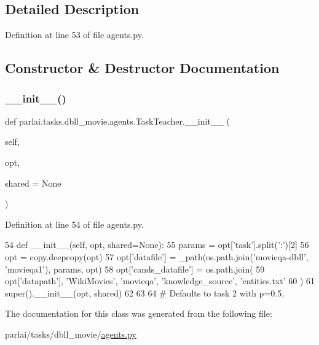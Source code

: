 \subsection{Detailed Description}


Definition at line 53 of file agents.\+py.



\subsection{Constructor \& Destructor Documentation}
\mbox{\label{classparlai_1_1tasks_1_1dbll__movie_1_1agents_1_1TaskTeacher_a2eed62654cfdb4fc25372c15bbb810b3}} 
\subsubsection{\texorpdfstring{\+\_\+\+\_\+init\+\_\+\+\_\+()}{\_\_init\_\_()}}
{\footnotesize\ttfamily def parlai.\+tasks.\+dbll\+\_\+movie.\+agents.\+Task\+Teacher.\+\_\+\+\_\+init\+\_\+\+\_\+ (\begin{DoxyParamCaption}\item[{}]{self,  }\item[{}]{opt,  }\item[{}]{shared = {\ttfamily None} }\end{DoxyParamCaption})}



Definition at line 54 of file agents.\+py.


\begin{DoxyCode}
54     \textcolor{keyword}{def }\_\_init\_\_(self, opt, shared=None):
55         params = opt[\textcolor{stringliteral}{'task'}].split(\textcolor{stringliteral}{':'})[2]
56         opt = copy.deepcopy(opt)
57         opt[\textcolor{stringliteral}{'datafile'}] = \_path(os.path.join(\textcolor{stringliteral}{'movieqa-dbll'}, \textcolor{stringliteral}{'movieqa1'}), params, opt)
58         opt[\textcolor{stringliteral}{'cands\_datafile'}] = os.path.join(
59             opt[\textcolor{stringliteral}{'datapath'}], \textcolor{stringliteral}{'WikiMovies'}, \textcolor{stringliteral}{'movieqa'}, \textcolor{stringliteral}{'knowledge\_source'}, \textcolor{stringliteral}{'entities.txt'}
60         )
61         super().\_\_init\_\_(opt, shared)
62 
63 
64 \textcolor{comment}{# Defaults to task 2 with p=0.5.}
\end{DoxyCode}


The documentation for this class was generated from the following file\+:\begin{DoxyCompactItemize}
\item 
parlai/tasks/dbll\+\_\+movie/\hyperlink{parlai_2tasks_2dbll__movie_2agents_8py}{agents.\+py}\end{DoxyCompactItemize}
